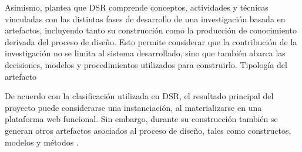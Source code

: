 Asimismo, \textcite{de2021design} plantea que DSR comprende conceptos, actividades y técnicas vinculadas con las distintas fases de desarrollo de una investigación basada en artefactos, incluyendo tanto su construcción como la producción de conocimiento derivada del proceso de diseño. Esto permite considerar que la contribución de la investigación no se limita al sistema desarrollado, sino que también abarca las decisiones, modelos y procedimientos utilizados para construirlo.
Tipología del artefacto

De acuerdo con la clasificación utilizada en DSR, el resultado principal del proyecto puede considerarse una instanciación, al materializarse en una plataforma web funcional. Sin embargo, durante su construcción también se generan otros artefactos asociados al proceso de diseño, tales como constructos, modelos y métodos \parencite{hevner2004design}.



